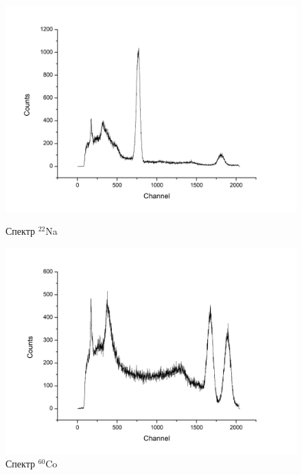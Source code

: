 \documentclass[a4paper]{article}
\begin{document}
\begin{figure}[ht]
\begin{center}
\begin{minipage}[h]{0.48\linewidth}
\includegraphics[width=1\linewidth]{image/Na.png}
\caption{Спектр $^{22}$Na} %
\end{minipage}
\hfill 
\begin{minipage}[ht]{0.48\linewidth}
\includegraphics[width=1\linewidth]{image/Co.png}
\caption{Спектр $^{60}$Co}
\end{minipage}
\end{center}
\end{figure}
\end{document}
